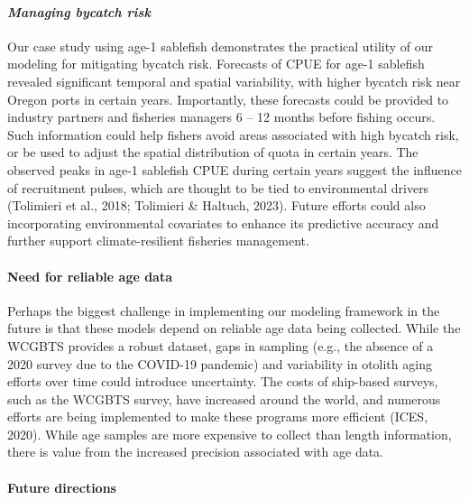 \documentclass[
]{article}
\let\oldparagraph\paragraph
\renewcommand{\paragraph}[1]{\oldparagraph{#1}\mbox{}}
\begin{document}
\paragraph{\texorpdfstring{\emph{Managing bycatch
risk}}{Managing bycatch risk}}\label{managing-bycatch-risk}

Our case study using age-1 sablefish demonstrates the practical utility
of our modeling for mitigating bycatch risk. Forecasts of CPUE for age-1
sablefish revealed significant temporal and spatial variability, with
higher bycatch risk near Oregon ports in certain years. Importantly,
these forecasts could be provided to industry partners and fisheries
managers 6 -- 12 months before fishing occurs. Such information could
help fishers avoid areas associated with high bycatch risk, or be used
to adjust the spatial distribution of quota in certain years. The
observed peaks in age-1 sablefish CPUE during certain years suggest the
influence of recruitment pulses, which are thought to be tied to
environmental drivers (Tolimieri et al., 2018; Tolimieri \& Haltuch,
2023). Future efforts could also incorporating environmental covariates
to enhance its predictive accuracy and further support climate-resilient
fisheries management.

\paragraph{Need for reliable age data}\label{need-for-reliable-age-data}

Perhaps the biggest challenge in implementing our modeling framework in
the future is that these models depend on reliable age data being
collected. While the WCGBTS provides a robust dataset, gaps in sampling
(e.g., the absence of a 2020 survey due to the COVID-19 pandemic) and
variability in otolith aging efforts over time could introduce
uncertainty. The costs of ship-based surveys, such as the WCGBTS survey,
have increased around the world, and numerous efforts are being
implemented to make these programs more efficient (ICES, 2020). While
age samples are more expensive to collect than length information, there
is value from the increased precision associated with age data.

\paragraph{Future directions}\label{future-directions}
\end{document}
